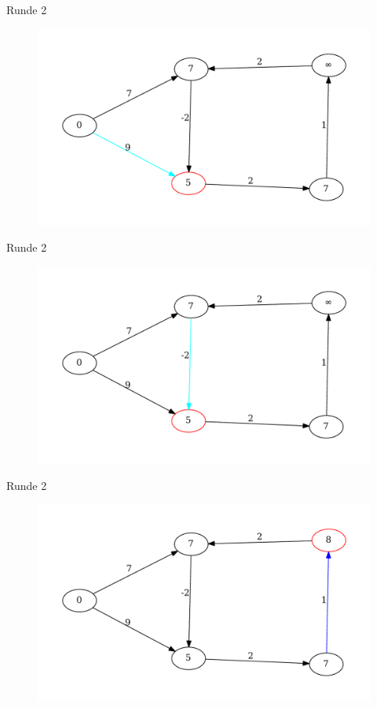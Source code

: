 \begin{frame}{Runde 2}
\begin{figure}[htbp]
\centering
\includegraphics[width=\linewidth]{bellman_ford_graphs/graph_09.pdf}
\end{figure}
\end{frame}

\begin{frame}{Runde 2}
\begin{figure}[htbp]
\centering
\includegraphics[width=\linewidth]{bellman_ford_graphs/graph_10.pdf}
\end{figure}
\end{frame}

\begin{frame}{Runde 2}
\begin{figure}[htbp]
\centering
\includegraphics[width=\linewidth]{bellman_ford_graphs/graph_11.pdf}
\end{figure}
\end{frame}

